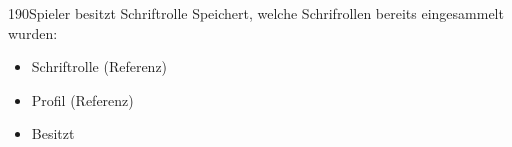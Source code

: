 \begin{data}{190}{Spieler besitzt Schriftrolle}
	Speichert, welche Schrifrollen bereits eingesammelt wurden:
	\begin{itemize}
		\item Schriftrolle (Referenz)
		\item Profil (Referenz)
		\item Besitzt
	\end{itemize}
\end{data}













%
